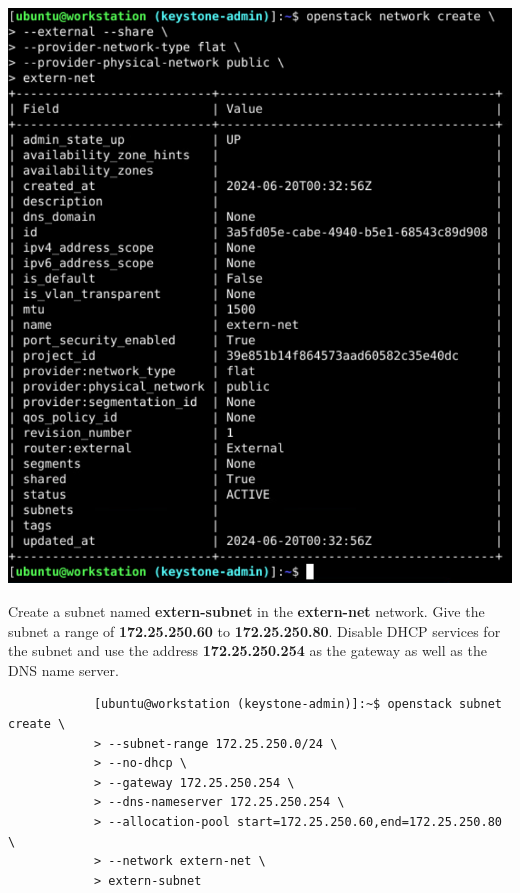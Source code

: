 \documentclass[letterpaper, 12pt]{article}
\begin{document}
\begin{enumerate}
\begin{labstep}
        \begin{center}
            \includegraphics[width=\linewidth]{images/part1/step12.png}
        \end{center}
    \end{labstep}

    \begin{labstep}
        Create a subnet named \textbf{extern-subnet} in the \textbf{extern-net} network.
        Give the subnet a range of \textbf{172.25.250.60} to \textbf{172.25.250.80}.
        Disable DHCP services for the subnet and use the address \textbf{172.25.250.254} as the gateway as well as the DNS name server.
        \begin{lstlisting}
            [ubuntu@workstation (keystone-admin)]:~$ openstack subnet create \
            > --subnet-range 172.25.250.0/24 \
            > --no-dhcp \
            > --gateway 172.25.250.254 \
            > --dns-nameserver 172.25.250.254 \
            > --allocation-pool start=172.25.250.60,end=172.25.250.80 \
            > --network extern-net \
            > extern-subnet
        \end{lstlisting}


\end{labstep}
\end{enumerate}
\end{document}
